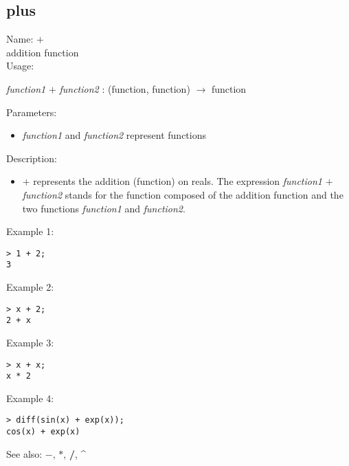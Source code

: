 \subsection{ plus }
\noindent Name: \textbf{$+$}\\
addition function\\

\noindent Usage: 
\begin{center}
\emph{function1} \textbf{$+$} \emph{function2} : (\textsf{function}, \textsf{function}) $\rightarrow$ \textsf{function}\\
\end{center}
Parameters: 
\begin{itemize}
\item \emph{function1} and \emph{function2} represent functions
\end{itemize}
\noindent Description: \begin{itemize}

\item \textbf{$+$} represents the addition (function) on reals. 
   The expression \emph{function1} \textbf{$+$} \emph{function2} stands for
   the function composed of the addition function and the two
   functions \emph{function1} and \emph{function2}.
\end{itemize}
\noindent Example 1: 
\begin{center}\begin{minipage}{15cm}\begin{Verbatim}[frame=single]
> 1 + 2;
3
\end{Verbatim}
\end{minipage}\end{center}
\noindent Example 2: 
\begin{center}\begin{minipage}{15cm}\begin{Verbatim}[frame=single]
> x + 2;
2 + x
\end{Verbatim}
\end{minipage}\end{center}
\noindent Example 3: 
\begin{center}\begin{minipage}{15cm}\begin{Verbatim}[frame=single]
> x + x;
x * 2
\end{Verbatim}
\end{minipage}\end{center}
\noindent Example 4: 
\begin{center}\begin{minipage}{15cm}\begin{Verbatim}[frame=single]
> diff(sin(x) + exp(x));
cos(x) + exp(x)
\end{Verbatim}
\end{minipage}\end{center}
See also: \textbf{$-$}, \textbf{$*$}, \textbf{/}, \textbf{\^}

